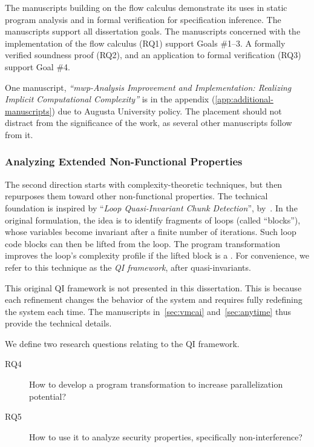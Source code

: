 The manuscripts building on the flow calculus demonstrate its uses in static
program analysis and in formal verification for specification inference. The
manuscripts support all dissertation goals. The manuscripts concerned with the
implementation of the flow calculus (RQ1) support Goals \#1--3. A formally
verified soundness proof (RQ2), and an application to formal verification (RQ3)
support Goal \#4.

One manuscript, \emph{\enquote{mwp-Analysis Improvement and Implementation:
Realizing Implicit Computational Complexity}} is in the appendix
(\autoref{app:additional-manuscripts}) due to Augusta University policy. The
placement should not distract from the significance of the work, as several
other manuscripts follow from it.

\subsubsection{Analyzing Extended Non-Functional Properties}

The second direction starts with complexity-theoretic techniques, but then
repurposes them toward other non-functional properties. The technical foundation
is inspired by \enquote{\emph{Loop Quasi-Invariant Chunk Detection}},
by~\textcite{moyen20172}. In the original formulation, the idea is to identify
fragments of loops (called \enquote{blocks}), whose variables become invariant
after a finite number of iterations. Such loop  code blocks
can then be lifted from the loop. The program transformation improves the loop's
complexity profile if the lifted block is a . For convenience,
we refer to this technique as the \emph{QI framework}, after quasi-invariants.

This original QI framework is not presented in this dissertation. This is
because each refinement changes the behavior of the system and requires fully
redefining the system each time. The manuscripts in~\autoref{sec:vmcai}
and~\autoref{sec:anytime} thus provide the technical details.

We define two research questions relating to the QI framework.

\begin{description}

\item[RQ4] How to develop a program transformation to increase parallelization
potential?

\item[RQ5] How to use it to analyze security properties, specifically
non-interference?

\end{description}

